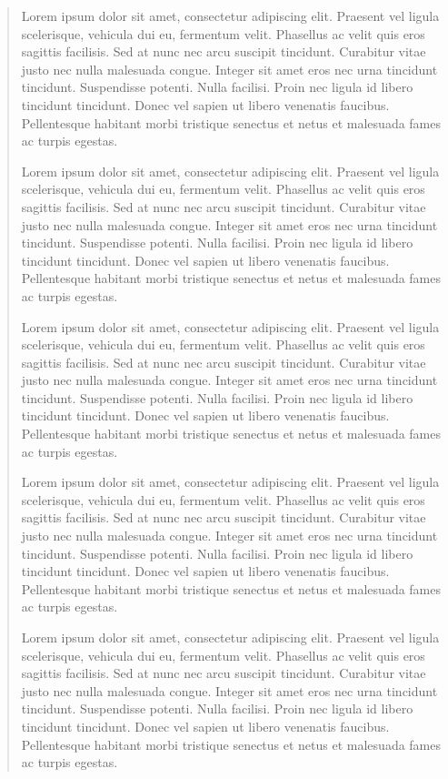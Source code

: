 

\begin{quote}
Lorem ipsum dolor sit amet, consectetur adipiscing elit. Praesent vel ligula scelerisque, vehicula dui eu, fermentum velit. 
Phasellus ac velit quis eros sagittis facilisis. Sed at nunc nec arcu suscipit tincidunt. 
Curabitur vitae justo nec nulla malesuada congue. Integer sit amet eros nec urna tincidunt tincidunt. 
Suspendisse potenti. Nulla facilisi. Proin nec ligula id libero tincidunt tincidunt. 
Donec vel sapien ut libero venenatis faucibus. Pellentesque habitant morbi tristique senectus et netus et malesuada fames ac turpis egestas.

Lorem ipsum dolor sit amet, consectetur adipiscing elit. Praesent vel ligula scelerisque, vehicula dui eu, fermentum velit. 
Phasellus ac velit quis eros sagittis facilisis. Sed at nunc nec arcu suscipit tincidunt. 
Curabitur vitae justo nec nulla malesuada congue. Integer sit amet eros nec urna tincidunt tincidunt. 
Suspendisse potenti. Nulla facilisi. Proin nec ligula id libero tincidunt tincidunt. 
Donec vel sapien ut libero venenatis faucibus. Pellentesque habitant morbi tristique senectus et netus et malesuada fames ac turpis egestas.

Lorem ipsum dolor sit amet, consectetur adipiscing elit. Praesent vel ligula scelerisque, vehicula dui eu, fermentum velit. 
Phasellus ac velit quis eros sagittis facilisis. Sed at nunc nec arcu suscipit tincidunt. 
Curabitur vitae justo nec nulla malesuada congue. Integer sit amet eros nec urna tincidunt tincidunt. 
Suspendisse potenti. Nulla facilisi. Proin nec ligula id libero tincidunt tincidunt. 
Donec vel sapien ut libero venenatis faucibus. Pellentesque habitant morbi tristique senectus et netus et malesuada fames ac turpis egestas.

Lorem ipsum dolor sit amet, consectetur adipiscing elit. Praesent vel ligula scelerisque, vehicula dui eu, fermentum velit. 
Phasellus ac velit quis eros sagittis facilisis. Sed at nunc nec arcu suscipit tincidunt. 
Curabitur vitae justo nec nulla malesuada congue. Integer sit amet eros nec urna tincidunt tincidunt. 
Suspendisse potenti. Nulla facilisi. Proin nec ligula id libero tincidunt tincidunt. 
Donec vel sapien ut libero venenatis faucibus. Pellentesque habitant morbi tristique senectus et netus et malesuada fames ac turpis egestas.

Lorem ipsum dolor sit amet, consectetur adipiscing elit. Praesent vel ligula scelerisque, vehicula dui eu, fermentum velit. 
Phasellus ac velit quis eros sagittis facilisis. Sed at nunc nec arcu suscipit tincidunt. 
Curabitur vitae justo nec nulla malesuada congue. Integer sit amet eros nec urna tincidunt tincidunt. 
Suspendisse potenti. Nulla facilisi. Proin nec ligula id libero tincidunt tincidunt. 
Donec vel sapien ut libero venenatis faucibus. Pellentesque habitant morbi tristique senectus et netus et malesuada fames ac turpis egestas.


\end{quote}
